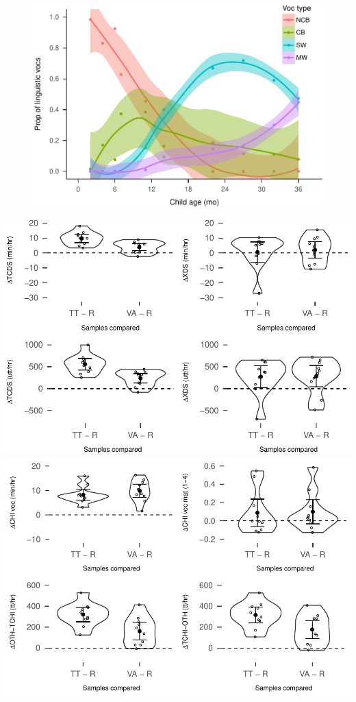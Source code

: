 \documentclass[man]{apa6}
\theoremstyle{definition}
\theoremstyle{definition}
\theoremstyle{definition}
\theoremstyle{remark}
\begin{document}
\begin{figure}
\centering
\includegraphics{Tseltal-CLE_files/figure-latex/plot_chi_voctypes_overall-1.pdf}
\caption{}
\end{figure}

\includegraphics{Tseltal-CLE_files/figure-latex/plot_sample_differences-1.pdf}
\includegraphics{Tseltal-CLE_files/figure-latex/plot_sample_differences-2.pdf}
\end{document}

